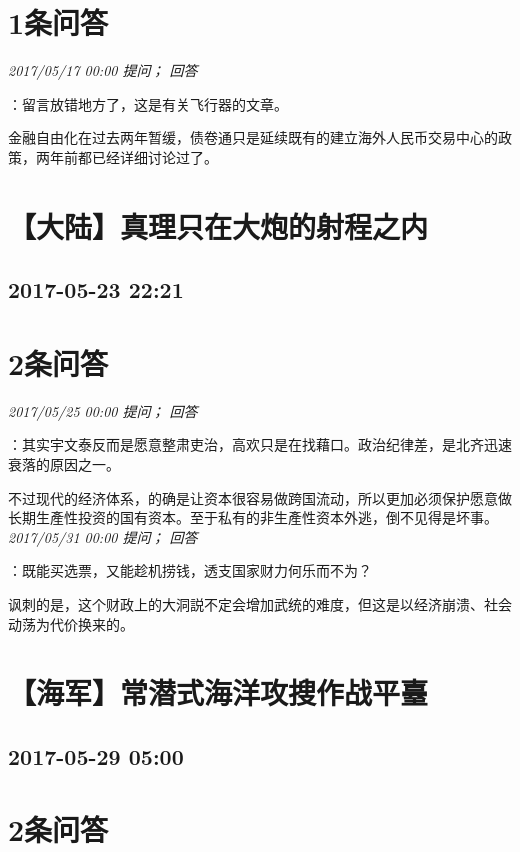 \documentclass[twocolumn]{ctexart}
\begin{document}
\section{1条问答}

\textit{\hfill\noindent\small 2017/05/17 00:00 提问； 回答}

：留言放错地方了，这是有关飞行器的文章。

金融自由化在过去两年暂缓，债卷通只是延续既有的建立海外人民币交易中心的政策，两年前都已经详细讨论过了。\\


\section{【大陆】真理只在大炮的射程之内}
\subsection{2017-05-23 22:21}


\section{2条问答}

\textit{\hfill\noindent\small 2017/05/25 00:00 提问； 回答}

：其实宇文泰反而是愿意整肃吏治，高欢只是在找藉口。政治纪律差，是北齐迅速衰落的原因之一。

不过现代的经济体系，的确是让资本很容易做跨国流动，所以更加必须保护愿意做长期生產性投资的国有资本。至于私有的非生產性资本外逃，倒不见得是坏事。\\

\textit{\hfill\noindent\small 2017/05/31 00:00 提问； 回答}

：既能买选票，又能趁机捞钱，透支国家财力何乐而不为？

讽刺的是，这个财政上的大洞説不定会增加武统的难度，但这是以经济崩溃、社会动荡为代价换来的。\\


\section{【海军】常潜式海洋攻搜作战平臺}
\subsection{2017-05-29 05:00}


\section{2条问答}
\end{document}
